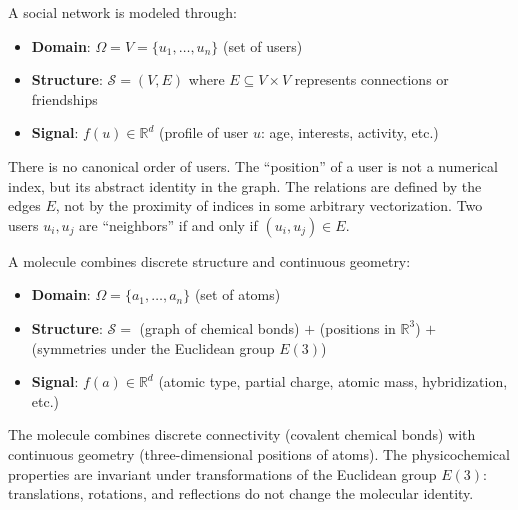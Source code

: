 \begin{example}\label{ex:red_social}
A social network is modeled through:
\begin{itemize}
	\item \textbf{Domain}: $\Omega = V = \{u_1, \ldots, u_n\}$ (set of users)
	\item \textbf{Structure}: $\mathcal{S} = (V, E)$ where $E \subseteq V \times V$ represents connections or friendships
	\item \textbf{Signal}: $f(u) \in \mathbb{R}^d$ (profile of user $u$: age, interests, activity, etc.)
\end{itemize}

There is no canonical order of users. The ``position'' of a user is not a numerical index, but its abstract identity in the graph. The relations are defined by the edges $E$, not by the proximity of indices in some arbitrary vectorization. Two users $u_i, u_j$ are ``neighbors'' if and only if $(u_i, u_j) \in E$.
\end{example}

\begin{example}\label{ex:molecula}
A molecule combines discrete structure and continuous geometry:
\begin{itemize}
	\item \textbf{Domain}: $\Omega = \{a_1, \ldots, a_n\}$ (set of atoms)
	\item \textbf{Structure}: $\mathcal{S} = $ (graph of chemical bonds) $+$ (positions in $\mathbb{R}^3$) $+$ (symmetries under the Euclidean group $E(3)$)
	\item \textbf{Signal}: $f(a) \in \mathbb{R}^d$ (atomic type, partial charge, atomic mass, hybridization, etc.)
\end{itemize}

The molecule combines discrete connectivity (covalent chemical bonds) with continuous geometry (three-dimensional positions of atoms). The physicochemical properties are invariant under transformations of the Euclidean group $E(3)$: translations, rotations, and reflections do not change the molecular identity.
\end{example}

